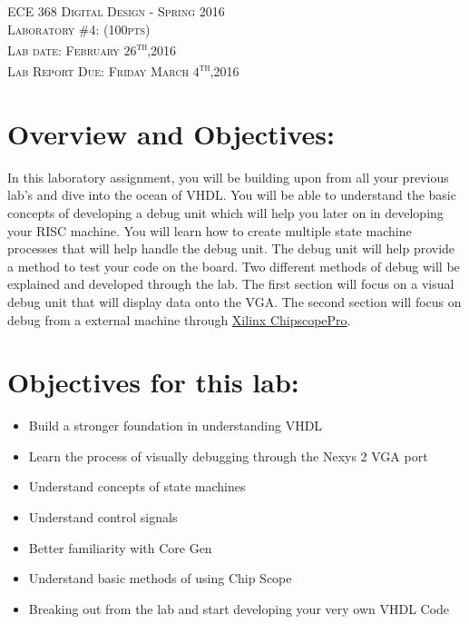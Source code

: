 \documentclass{article}
\begin{document}
\begin{center}
\textsc{\huge ECE 368 Digital Design - Spring 2016}\\[1cm]
\textsc{{\LARGE Laboratory \#4: (100pts)}}\\[0.5cm]
\textsc{\Large Lab date: February $26$\textsuperscript{th},2016}\\[0.5cm]
\textsc{\Large Lab Report Due: Friday March $4$\textsuperscript{th},2016}\\[1cm]
\end{center}

\section{Overview and Objectives:}
In this laboratory assignment, you will be building upon from all your previous lab's and dive into the ocean of VHDL. You will be able to understand the basic concepts of developing a debug unit which will help you later on in developing your RISC machine. You will learn how to create multiple state machine processes that will help handle the debug unit. The debug unit will help provide a method to test your code on the board. Two different methods of debug will be explained and developed through the lab. The first section will focus on a visual debug unit that will display data onto the VGA. The second section will focus on debug from a external machine through \href{http://www.xilinx.com/products/design-tools/chipscopepro.html}{Xilinx\textsuperscript{\textregistered} Chipscope\texttrademark Pro}.

\section{Objectives for this lab:}
\begin{itemize}
  \item Build a stronger foundation in understanding VHDL
  \item Learn the process of visually debugging through the Nexys 2 VGA port
  \item Understand concepts of state machines
  \item Understand control signals
  \item Better familiarity with Core Gen
  \item Understand basic methods of using Chip Scope
  \item Breaking out from the lab and start developing your very own VHDL Code
\end{itemize}
\end{document}
